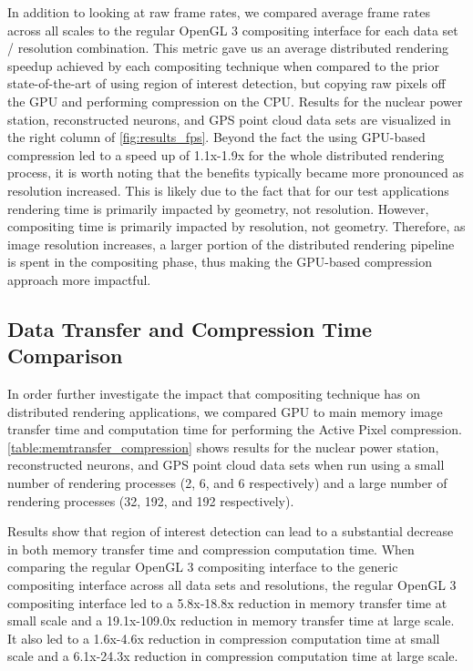 \documentclass{vgtc}                          %
\begin{document}
In addition to looking at raw frame rates, we compared average frame rates across all scales to the regular OpenGL 3 compositing interface for each data set / resolution combination. This metric gave us an average distributed rendering speedup achieved by each compositing technique when compared to the prior state-of-the-art of using region of interest detection, but copying raw pixels off the GPU and performing compression on the CPU. Results for the nuclear power station, reconstructed neurons, and GPS point cloud data sets are visualized in the right column of \autoref{fig:results_fps}. Beyond the fact the using GPU-based compression led to a speed up of 1.1x-1.9x for the whole distributed rendering process, it is worth noting that the benefits typically became more pronounced as resolution increased. This is likely due to the fact that for our test applications rendering time is primarily impacted by geometry, not resolution. However, compositing time is primarily impacted by resolution, not geometry. Therefore, as image resolution increases, a larger portion of the distributed rendering pipeline is spent in the compositing phase, thus making the GPU-based compression approach more impactful.

\subsection{Data Transfer and Compression Time Comparison}
In order further investigate the impact that compositing technique has on distributed rendering applications, we compared GPU to main memory image transfer time and computation time for performing the Active Pixel compression. \autoref{table:memtransfer_compression} shows results for the nuclear power station, reconstructed neurons, and GPS point cloud data sets when run using a small number of rendering processes (2, 6, and 6 respectively) and a large number of rendering processes (32, 192, and 192 respectively).

Results show that region of interest detection can lead to a substantial decrease in both memory transfer time and compression computation time. When comparing the regular OpenGL 3 compositing interface to the generic compositing interface across all data sets and resolutions, the regular OpenGL 3 compositing interface led to a 5.8x-18.8x reduction in memory transfer time at small scale and a 19.1x-109.0x reduction in memory transfer time at large scale. It also led to a 1.6x-4.6x reduction in compression computation time at small scale and a 6.1x-24.3x reduction in compression computation time at large scale.
\end{document}
